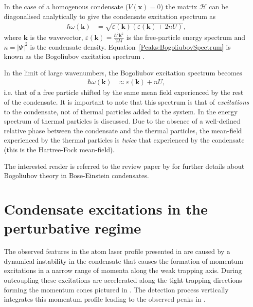 In the case of a homogenous condensate ($V(\bm{x}) = 0$) the matrix $\mathcal{H}$ can be diagonalised analytically to give the condensate excitation spectrum as
\begin{align}
    \hbar \omega(\bm{k}) &= \sqrt{\varepsilon(\bm{k})\left(\varepsilon(\bm{k}) + 2 n U \right)},
    \label{Peaks:BogoliubovSpectrum}
\end{align}
where $\bm{k}$ is the wavevector, $\displaystyle \varepsilon(\bm{k}) = \frac{\hbar^2 \bm{k}^2}{2 M}$ is the free-particle energy spectrum and $n = \big|\Psi \big|^2$ is the condensate density. Equation~\eqref{Peaks:BogoliubovSpectrum} is known as the Bogoliubov excitation spectrum \citep{Bogoliubov:1947}.  

In the limit of large wavenumbers, the Bogoliubov excitation spectrum becomes
\begin{align}
    \hbar \omega(\bm{k}) &\approx \varepsilon(\bm{k}) + n U,
\end{align}
i.e. that of a free particle shifted by the same mean field experienced by the rest of the condensate.  It is important to note that this spectrum is that of \emph{excitations} to the condensate, not of thermal particles added to the system.  In  the energy spectrum of thermal particles is discussed.  Due to the absence of a well-defined relative phase between the condensate and the thermal particles, the mean-field experienced by the thermal particles is \emph{twice} that experienced by the condensate (this is the Hartree-Fock mean-field).

The interested reader is referred to the review paper by \citet{Ozeri:2005} for further details about Bogoliubov theory in Bose-Einstein condensates.

\section{Condensate excitations in the perturbative regime}
\label{Peaks:PerturbativeApproach}

The observed features in the atom laser profile presented in  are caused by a dynamical instability in the condensate that causes the formation of momentum excitations in a narrow range of momenta along the weak trapping axis. During outcoupling these excitations are accelerated along the tight trapping directions forming the momentum cones pictured in . The detection process vertically integrates this momentum profile leading to the observed peaks in .

